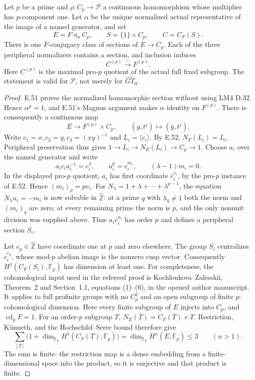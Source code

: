 Let \(p\) be a prime and \(\rho:C_p\to\mathcal P\) a
continuous homomorphism whose multiplier has
\(p\)-component one. Let \(\alpha\) be the unique normalized
actual representative of the image of a named generator,
and set
\[
 E=F\rtimes_\alpha C_p,\qquad
 S=\{1\}\times C_p,\qquad C=C_F(S).
\]
There is one \(F\)-conjugacy class of sections of
\(E\to C_p\). Each of the three peripheral normalizers
contains a section, and inclusion induces
\[
                     C^{(p)}\xrightarrow{\sim}F^{(p)}.
\]
Here \(C^{(p)}\) is the maximal pro-\(p\) quotient of
the actual full fixed subgroup. The statement is valid
for \(\mathcal P\), not merely for \(\widehat{GT}_0\).

\begin{proof}
E.51 proves the normalized homomorphic section without
using LM4 D.32. Hence \(\alpha^p=1\), and E.51's
Magnus argument makes \(\alpha\) identity on \(F^{(p)}\).
There is consequently a continuous map
\[
 E\longrightarrow F^{(p)}\times C_p,
 \qquad (g,t^j)\longmapsto(\bar g,t^j).
\]
Write \(c_1=x,c_2=y,c_3=(xy)^{-1}\) and
\(L_i=\overline{\langle c_i\rangle}\). By E.52,
\(N_F(L_i)=L_i\). Peripheral preservation thus gives
\(1\to L_i\to N_E(L_i)\to C_p\to1\).
Choose \(a_i\) over the named generator and write
\[
 a_i c_i a_i^{-1}=c_i^\lambda,
 \qquad a_i^p=c_i^{m_i},
 \qquad (\lambda-1)m_i=0.
\]
In the displayed pro-\(p\) quotient,
\(a_i\) has first coordinate \(\bar c_i^{v_i}\),
by the pro-\(p\) instance of E.52. Hence
\((m_i)_p=pv_i\). For
\(N_\lambda=1+\lambda+\cdots+\lambda^{p-1}\),
the equation \(N_\lambda u_i=-m_i\) is now solvable
in \(\widehat{\mathbb Z}\): at a prime \(q\) with
\(\lambda_q\ne1\) both the norm and \((m_i)_q\)
are zero; at every remaining prime the norm is \(p\),
and the only nonunit division was supplied above.
Thus \(a_ic_i^{u_i}\) has order \(p\) and defines
a peripheral section \(S_i\).

Let \(e_p\in\widehat{\mathbb Z}\) have coordinate
one at \(p\) and zero elsewhere. The group \(S_i\)
centralizes \(c_i^{e_p}\), whose mod-\(p\)
abelian image is the nonzero cusp vector.
Consequently \(H^1(C_F(S_i),\mathbb F_p)\) has
dimension at least one. For completeness, the
cohomological input used in the refereed proof is
Kochloukova--Zalesskii, Theorem~2 and Section~1.1,
equations (1)--(6), in the opened author manuscript.
It applies to full profinite groups with no
\(C_p^2\) and an open subgroup of finite
\(p\)-cohomological dimension.\cite{A_KZ2007}
Here every finite subgroup of \(E\) injects into
\(C_p\), and \(\operatorname{cd}_pF=1\).
For an order-\(p\) subgroup \(T\),
\(N_E(T)=C_F(T)\times T\). Restriction, K\"unneth,
and the Hochschild--Serre bound therefore give
\[
 \sum_{[T]}
 \bigl(1+\dim_{\mathbb F_p}H^1(C_F(T),\mathbb F_p)\bigr)
       =\dim_{\mathbb F_p}H^n(E,\mathbb F_p)\le3
       \qquad(n>1).
\]
The sum is finite: the restriction map is a dense
embedding from a finite-dimensional space into the
product, so it is surjective and that product is finite.


\end{proof}
